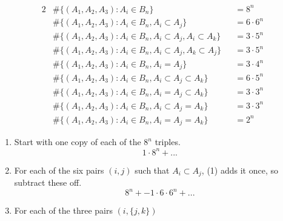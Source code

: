 \documentclass{article}
\newenvironment{solution}[1][Solution.]{\begin{trivlist}
\item[\hskip \labelsep {\bfseries #1}]}{\end{trivlist}}
\begin{document}
\begin{solution}
\begin{enumerate}[(i)]
    \begin{alignat}{2}
      &\#\{(A_1, A_2, A_3) : A_i \in B_n\}                                   &&= 8^n \\
      &\#\{(A_1, A_2, A_3) : A_i \in B_n, A_i \subset A_j\}                  &&= 6\cdot6^n \\
      &\#\{(A_1, A_2, A_3) : A_i \in B_n, A_i \subset A_j, A_i \subset A_k\} &&= 3\cdot5^n \\
      &\#\{(A_1, A_2, A_3) : A_i \in B_n, A_i \subset A_j, A_k \subset A_j\} &&= 3\cdot5^n \\
      &\#\{(A_1, A_2, A_3) : A_i \in B_n, A_i = A_j\}                        &&= 3\cdot4^n \\
      &\#\{(A_1, A_2, A_3) : A_i \in B_n, A_i \subset A_j \subset A_k\}      &&= 6\cdot5^n \\
      &\#\{(A_1, A_2, A_3) : A_i \in B_n, A_i = A_j \subset A_k\}            &&= 3\cdot3^n \\
      &\#\{(A_1, A_2, A_3) : A_i \in B_n, A_i \subset A_j = A_k\}            &&= 3\cdot3^n \\
      &\#\{(A_1, A_2, A_3) : A_i \in B_n, A_i = A_j = A_k\}                  &&= 2^n
  \end{alignat}
  \begin{enumerate}[(1)]
    \item Start with one copy of each of the $8^n$ triples. \[
      1\cdot8^n + ...
    \]
    \item For each of the six pairs $(i, j)$
    such that $A_i \subset A_j$,
    (1) adds it once,
    so subtract these off.
    \[
      8^n + -1\cdot6\cdot6^n + ...
    \]
    \item For each of the three pairs $(i, \{j, k\})$

\end{enumerate}
\end{enumerate}
\end{solution}
\end{document}
